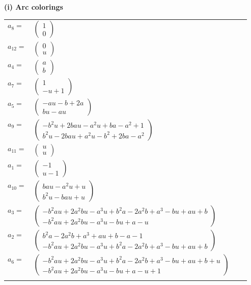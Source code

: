 \documentclass[1p]{elsarticle_modified}
\theoremstyle{definition}
\begin{document}
\flushleft \textbf{(i) Arc colorings}\\
\begin{tabular}{m{7pt} m{180pt} m{7pt} m{180pt} }
\flushright $a_{8}=$&$\begin{pmatrix}1\\0\end{pmatrix}$ \\
\flushright $a_{12}=$&$\begin{pmatrix}0\\u\end{pmatrix}$ \\
\flushright $a_{4}=$&$\begin{pmatrix}a\\b\end{pmatrix}$ \\
\flushright $a_{7}=$&$\begin{pmatrix}1\\- u+1\end{pmatrix}$ \\
\flushright $a_{5}=$&$\begin{pmatrix}- a u- b+2 a\\b u- a u\end{pmatrix}$ \\
\flushright $a_{9}=$&$\begin{pmatrix}- b^2 u+2 b a u- a^2 u+b a- a^2+1\\b^2 u-2 b a u+a^2 u- b^2+2 b a- a^2\end{pmatrix}$ \\
\flushright $a_{11}=$&$\begin{pmatrix}u\\u\end{pmatrix}$ \\
\flushright $a_{1}=$&$\begin{pmatrix}-1\\u-1\end{pmatrix}$ \\
\flushright $a_{10}=$&$\begin{pmatrix}b a u- a^2 u+u\\b^2 u- b a u+u\end{pmatrix}$ \\
\flushright $a_{3}=$&$\begin{pmatrix}- b^2 a u+2 a^2 b u- a^3 u+b^2 a-2 a^2 b+a^3- b u+a u+b\\- b^2 a u+2 a^2 b u- a^3 u- b u+a- u\end{pmatrix}$ \\
\flushright $a_{2}=$&$\begin{pmatrix}b^2 a-2 a^2 b+a^3+a u+b- a-1\\- b^2 a u+2 a^2 b u- a^3 u+b^2 a-2 a^2 b+a^3- b u+a u+b\end{pmatrix}$ \\
\flushright $a_{6}=$&$\begin{pmatrix}- b^2 a u+2 a^2 b u- a^3 u+b^2 a-2 a^2 b+a^3- b u+a u+b+u\\- b^2 a u+2 a^2 b u- a^3 u- b u+a- u+1\end{pmatrix}$\\&\end{tabular}
\end{document}
